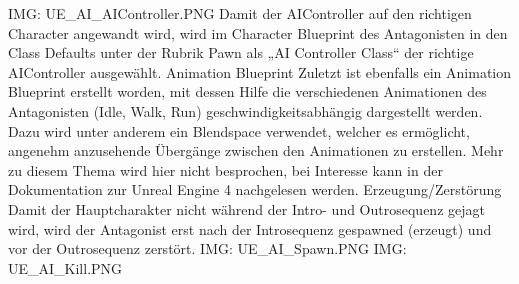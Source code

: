 {IMG: UE_AI_AIController.PNG}
Damit der AIController auf den richtigen Character angewandt wird, wird im Character Blueprint des Antagonisten in den Class Defaults unter der Rubrik Pawn als „AI Controller Class“ der richtige AIController ausgewählt.
Animation Blueprint
Zuletzt ist ebenfalls ein Animation Blueprint erstellt worden, mit dessen Hilfe die verschiedenen Animationen des Antagonisten (Idle, Walk, Run) geschwindigkeitsabhängig dargestellt werden. Dazu wird unter anderem ein Blendspace verwendet, welcher es ermöglicht, angenehm anzusehende Übergänge zwischen den Animationen zu erstellen. Mehr zu diesem Thema wird hier nicht besprochen, bei Interesse kann in der Dokumentation zur Unreal Engine 4 nachgelesen werden.
Erzeugung/Zerstörung
Damit der Hauptcharakter nicht während der Intro- und Outrosequenz gejagt wird, wird der Antagonist erst nach der Introsequenz gespawned (erzeugt) und vor der Outrosequenz zerstört.
{IMG: UE_AI_Spawn.PNG}
{IMG: UE_AI_Kill.PNG}

